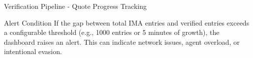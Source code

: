 \begin{frame}{Verification Pipeline - Quote Progress Tracking}
  \vspace{0.1cm}

  \begin{alertblock}{Alert Condition}
    \scriptsize
    If the gap between total IMA entries and verified entries exceeds a configurable threshold
    (e.g., 1000 entries or 5 minutes of growth), the dashboard raises an alert.
    This can indicate network issues, agent overload, or intentional evasion.
  \end{alertblock}
\end{frame}
